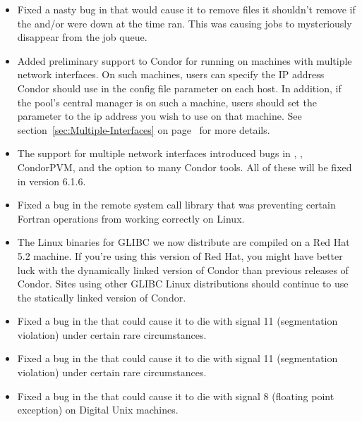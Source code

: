 \begin{itemize}

\item Fixed a nasty bug in  that would cause it to
remove files it shouldn't remove if the  and/or
 were down at the time  ran.
This was causing jobs to mysteriously disappear from the job queue.

\item Added preliminary support to Condor for running on machines with
multiple network interfaces.
On such machines, users can specify the IP address Condor should use
in the  config file parameter on each host. 
In addition, if the pool's central manager is on such a machine, users
should set the  parameter to the ip address you wish
to use on that machine.
See section~\ref{sec:Multiple-Interfaces} on
page~\pageref{sec:Multiple-Interfaces} for more details.

\item The support for multiple network interfaces introduced bugs in
, , CondorPVM, and the 
option to many Condor tools.
All of these will be fixed in version 6.1.6.

\item Fixed a bug in the remote system call library that was
preventing certain Fortran operations from working correctly on
Linux.  

\item The Linux binaries for GLIBC we now distribute are compiled on a
Red Hat 5.2 machine.
If you're using this version of Red Hat, you might have better luck
with the dynamically linked version of Condor than previous releases
of Condor.
Sites using other GLIBC Linux distributions should continue to use the
statically linked version of Condor.

\item Fixed a bug in the  that could cause it to die
with signal 11 (segmentation violation) under certain rare
circumstances. 

\item Fixed a bug in the  that could cause it to die
with signal 11 (segmentation violation) under certain rare
circumstances. 

\item Fixed a bug in the  that could cause it to
die with signal 8 (floating point exception) on Digital Unix
machines. 


\end{itemize}

